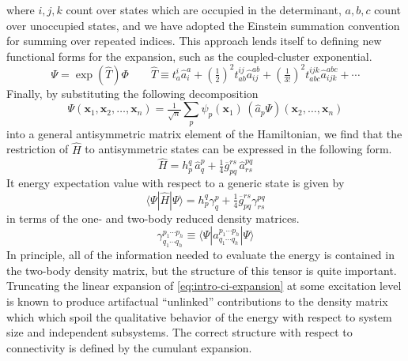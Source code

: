 where \(i, j, k\) count over states which are occupied in the determinant, \(a,
b, c\) count over unoccupied states, and we have adopted the Einstein summation
convention for summing over repeated indices.
This approach lends itself to defining new functional forms for the expansion,
such as the coupled-cluster exponential.
\begin{equation}
    \Psi
    =
    \exp(\hat{T})
    \Phi
    \qquad
    \hat{T}
    \equiv
    t_a^i
    \hat{a}^a_i
    +
    (\tfrac{1}{2})^2
    t_{ab}^{ij}
    \hat{a}^{ab}_{ij}
    +
    (\tfrac{1}{3!})^2
    t_{abc}^{ijk}
    \hat{a}^{abc}_{ijk}
    +
    \cdots
\end{equation}
Finally, by substituting the following decomposition
\begin{equation}
    \Psi(\mathbf{x}_1, \mathbf{x}_2, \ldots, \mathbf{x}_n)
    =
    \tfrac{1}{\sqrt{n}}
    \sum_p
    \psi_p(\mathbf{x}_1)\,
    (\hat{a}_p\Psi)(\mathbf{x}_2, \ldots, \mathbf{x}_n)
\end{equation}
into a general antisymmetric matrix element of the Hamiltonian, we find that the
restriction of \(\hat{H}\) to antisymmetric states can be expressed in the
following form.
\begin{equation}
    \hat{H}
    =
    h_p^q\,
    \hat{a}^p_q
    +
    \tfrac{1}{4}
    \overline{g}_{pq}^{rs}\,
    \hat{a}^{pq}_{rs}
\end{equation}
It energy expectation value with respect to a generic state is given by
\begin{equation}
    \langle\Psi|
    \hat{H}
    |\Psi\rangle
    =
    h_p^q
    \gamma^p_q
    +
    \tfrac{1}{4}
    \overline{g}_{pq}^{rs}
    \gamma^{pq}_{rs}
\end{equation}
in terms of the one- and two-body reduced density matrices.
\begin{equation}
    \gamma^{p_1\cdots p_h}_{q_1\cdots q_h}
    \equiv
    \langle\Psi|a^{p_1\cdots p_h}_{q_1\cdots q_h}|\Psi\rangle
\end{equation}
In principle, all of the information needed to evaluate the energy is contained
in the two-body density matrix, but the structure of this tensor is quite
important.
Truncating the linear expansion of \cref{eq:intro-ci-expansion} at some
excitation level is known to produce artifactual ``unlinked'' contributions to
the density matrix which which spoil the qualitative behavior of the energy with
respect to system size and independent subsystems.
The correct structure with respect to connectivity is defined by the cumulant
expansion.\cite{McCullagh:1987}
